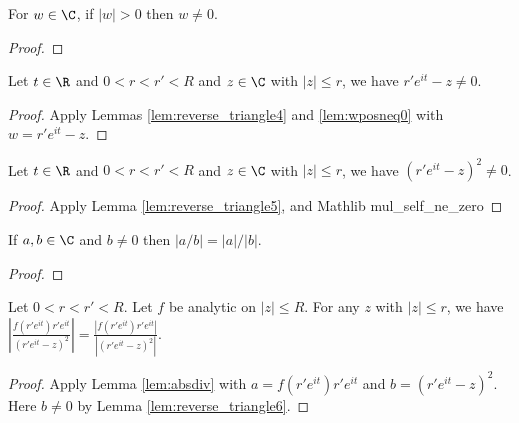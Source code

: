 
\begin{lemma} \label{lem:wposneq0} \leanok
For $w\in\C$, if $|w|>0$ then $w\neq0$.
\end{lemma}
\begin{proof}\leanok
\end{proof}


\begin{lemma} \label{lem:reverse_triangle5} \leanok
Let $t\in\R$ and $0 < r < r' < R$ and $z\in\C$ with $|z|\le r$, we have $r'e^{it}-z \neq 0$.
\end{lemma}
\begin{proof}\leanok
{}
Apply Lemmas \ref{lem:reverse_triangle4} and \ref{lem:wposneq0} with $w=r'e^{it}-z$.
\end{proof}


\begin{lemma} \label{lem:reverse_triangle6} \leanok
Let $t\in\R$ and $0 < r < r' < R$ and $z\in\C$ with $|z|\le r$, we have $(r'e^{it}-z)^2 \neq 0$.
\end{lemma}
\begin{proof}\leanok
{}
Apply Lemma \ref{lem:reverse_triangle5}, and Mathlib mul\_self\_ne\_zero
\end{proof}


\begin{lemma}\label{lem:absdiv} \leanok
If $a,b\in\C$ and $b\neq0$ then $|a/b|=|a|/|b|$.
\end{lemma}
\begin{proof}\leanok
\end{proof}


\begin{lemma}\label{lem:modulus_of_integrand_product} \leanok
Let $0 < r < r' < R$. Let $f$ be analytic on $|z| \le R$. For any $z$ with $|z| \le r$, we have
$\left|\frac{f(r'e^{it}) r'e^{it}}{(r'e^{it}-z)^2}\right| = \frac{|f(r'e^{it}) r'e^{it}|}{|(r'e^{it}-z)^2|}$.
\end{lemma}
\begin{proof}\leanok
{}
Apply Lemma \ref{lem:absdiv} with $a=f(r'e^{it}) r'e^{it}$ and $b=(r'e^{it}-z)^2$. Here $b\neq0$ by Lemma \ref{lem:reverse_triangle6}.
\end{proof}


